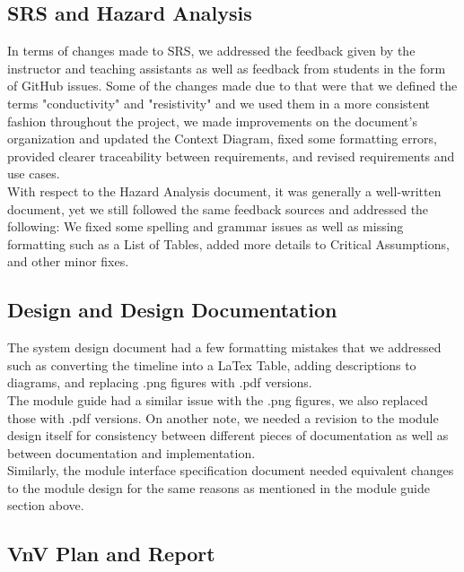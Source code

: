 \documentclass{article}
\begin{document}
\subsection{SRS and Hazard Analysis}

In terms of changes made to SRS, we addressed the feedback given by the instructor and teaching assistants as well as feedback from students in the form of GitHub issues. Some of the changes made due to that were that we defined the terms "conductivity" and "resistivity" and we used them in a more consistent fashion throughout the project, we made improvements on the document's organization and updated the Context Diagram, fixed some formatting errors, provided clearer traceability between requirements, and revised requirements and use cases.\\

\noindent With respect to the Hazard Analysis document, it was generally a well-written document, yet we still followed the same feedback sources and addressed the following: We fixed some spelling and grammar issues as well as missing formatting such as a List of Tables, added more details to Critical Assumptions, and other minor fixes.

\subsection{Design and Design Documentation}

The system design document had a few formatting mistakes that we addressed such as converting the timeline into a LaTex Table, adding descriptions to diagrams, and replacing .png figures with .pdf versions.\\

\noindent The module guide had a similar issue with the .png figures, we also replaced those with .pdf versions. On another note, we needed a revision to the module design itself for consistency between different pieces of documentation as well as between documentation and implementation.\\

\noindent Similarly, the module interface specification document needed equivalent changes to the module design for the same reasons as mentioned in the module guide section above.

\subsection{VnV Plan and Report}
\end{document}
